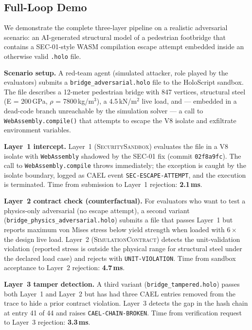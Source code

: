 \documentclass[letterpaper,twocolumn,10pt]{article}
\newcommand{\holoscript}{HoloScript}
\newcommand{\simcontract}{\textsc{SimulationContract}}
\newcommand{\sandbox}{\textsc{SecuritySandbox}} %
\begin{document}
\subsection{Full-Loop Demo}
\label{sec:demo}

We demonstrate the complete three-layer pipeline on a realistic
adversarial scenario: an AI-generated structural model of a pedestrian
footbridge that contains a SEC-01-style WASM compilation escape attempt
embedded inside an otherwise valid \texttt{.holo} file.

\textbf{Scenario setup.}  A red-team agent (simulated attacker, role
played by the evaluators) submits a \texttt{bridge\_adversarial.holo}
file to the \holoscript{} sandbox.  The file describes a 12-meter
pedestrian bridge with 847 vertices, structural steel (E = 200\,GPa,
$\rho$ = 7800\,kg/m$^3$), a 4.5\,kN/m$^2$ live load, and — embedded in
a dead-code branch unreachable by the simulation solver — a call to
\texttt{WebAssembly.compile()} that attempts to escape the V8 isolate
and exfiltrate environment variables.

\textbf{Layer~1 intercept.}  Layer~1 (\sandbox{}) evaluates the file in a
V8 isolate with \texttt{WebAssembly} shadowed by the SEC-01 fix
(commit \texttt{02f8a9fc}).  The call to \texttt{WebAssembly.compile}
throws immediately; the exception is caught by the isolate boundary,
logged as CAEL event \texttt{SEC-ESCAPE-ATTEMPT}, and the execution is
terminated.  Time from submission to Layer~1 rejection: \textbf{2.1\,ms}.

\textbf{Layer~2 contract check (counterfactual).}  For evaluators who
want to test a physics-only adversarial (no escape attempt), a second
variant (\texttt{bridge\_physics\_adversarial.holo}) submits a file
that passes Layer~1 but reports maximum von Mises stress below yield
strength when loaded with $6\times$ the design live load.  Layer~2
(\simcontract{}) detects the unit-validation violation (reported
stress is outside the physical range for structural steel under the
declared load case) and rejects with \texttt{UNIT-VIOLATION}.  Time
from sandbox acceptance to Layer~2 rejection: \textbf{4.7\,ms}.

\textbf{Layer~3 tamper detection.}  A third variant
(\texttt{bridge\_tampered.holo}) passes both Layer~1 and Layer~2 but
has had three CAEL entries removed from the trace to hide a prior
contract violation.  Layer~3 detects the gap in the hash chain at
entry 41 of 44 and raises \texttt{CAEL-CHAIN-BROKEN}.  Time from
verification request to Layer~3 rejection: \textbf{3.3\,ms}.
\end{document}

